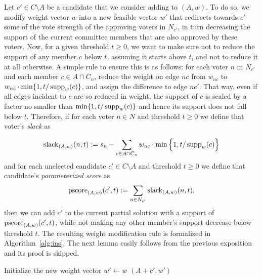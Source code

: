 Let $c'\in C\setminus A$ be a candidate that we consider adding to $(A,w)$. To do so, we modify weight vector $w$ into a new feasible vector $w'$ that redirects towards $c'$ some of the vote strength of the approving voters in $N_{c'}$, in turn decreasing the support of the current committee members that are also approved by these voters. Now, for a given threshold $t\geq 0$, we want to make sure not to reduce the support of any member $c$ below $t$, assuming it starts above $t$, and not to reduce it at all otherwise. A simple rule to ensure this is as follows: for each voter $n$ in $N_{c'}$ and each member $c\in A\cap C_n$, reduce the weight on edge $nc$ from $w_{nc}$ to $w_{nc}\cdot \min\{1, t/\operatorname{supp}_w(c)\}$, and assign the difference to edge $nc'$. That way, even if all edges incident to $c$ are so reduced in weight, the support of $c$ is scaled by a factor no smaller than $\min\{1, t/\operatorname{supp}_w(c)\}$ and hence its support does not fall below $t$.
%
Therefore, if for each voter $n\in N$ and threshold $t\geq 0$ we define that voter's \emph{slack} as

\begin{align}
    \operatorname{slack}_{(A,w)}(n,t):= s_n - \sum_{c\in A\cap C_n} w_{nc} \cdot\min \Big\{ 1, t/\operatorname{supp}_w(c)\Big\} \label{eq:slack}
\end{align}
%
and for each unelected candidate $c'\in C\setminus A$ and threshold $t\geq 0$ we define that candidate's \emph{parameterized score} as
%
\begin{equation}\label{eq:prescore}
    \operatorname{pscore}_{(A,w)}(c',t) := \sum_{n\in N_{c'}} \operatorname{slack}_{(A,w)}(n,t),
\end{equation}
%
then we can add $c'$ to the current partial solution with a support of $\operatorname{pscore}_{(A,w)}(c',t)$, while not making any other member's support decrease below threshold $t$. The resulting weight modification rule is formalized in Algorithm~\ref{alg:ins}. The next lemma easily follows from the previous exposition and its proof is skipped.

\begin{algorithm}[htb]
\SetAlgoLined
{}
Initialize the new weight vector $w'\leftarrow w$\;
\Return $(A+c',w')$\;
 \caption{$\ins(A,w,c',t)$}
\label{alg:ins}
\end{algorithm}

